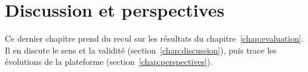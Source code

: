 \chapter{Discussion et perspectives}
\label{chap:discussion_perspectives}

Ce dernier chapitre prend du recul sur les résultats du chapitre~\ref{chap:evaluation}. Il en discute le sens et la validité (section~\ref{chap:discussion}), puis trace les évolutions de la plateforme (section~\ref{chap:perspectives}).



